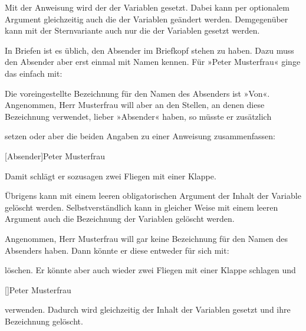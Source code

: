 \begin{Declaration}
\end{Declaration}
Mit der Anweisung  wird der  der Variablen
 gesetzt. Dabei kann per optionalem Argument gleichzeitig auch die
 der Variablen geändert werden. Demgegenüber kann mit der
Sternvariante  auch nur die  der
Variablen  gesetzt werden.
\begin{Example}
  In Briefen ist es üblich, den Absender im Briefkopf stehen zu haben. Dazu
  muss \KOMAScript{} den Absender aber erst einmal mit Namen kennen. Für
  »Peter Musterfrau« ginge das einfach mit:
\begin{lstcode}
\end{lstcode}
  Die voreingestellte Bezeichnung für den Namen des Absenders ist
  »Von«. Angenommen, Herr Musterfrau will aber an den Stellen, an denen
  \KOMAScript{} diese Bezeichnung verwendet, lieber »Absender« haben, so
  müsste er zusätzlich
\begin{lstcode}
\end{lstcode}
  setzen oder aber die beiden Angaben zu einer Anweisung zusammenfassen:
\begin{lstcode}
  [Absender]{Peter Musterfrau}
\end{lstcode}
  Damit schlägt er sozusagen zwei Fliegen mit einer Klappe.
\end{Example}
Übrigens kann mit einem leeren obligatorischen Argument 
der Inhalt der Variable gelöscht werden. Selbstverständlich kann in
gleicher Weise mit einem leeren Argument  auch die
Bezeichnung der Variablen gelöscht werden.
\begin{Example}
  Angenommen, Herr Musterfrau will gar keine Bezeichnung für den Namen des
  Absenders haben. Dann könnte er diese entweder für sich mit:
\begin{lstcode}
\end{lstcode}
  löschen. Er könnte aber auch wieder zwei Fliegen mit einer Klappe
  schlagen und
\begin{lstcode}
  []{Peter Musterfrau}
\end{lstcode}
  verwenden. Dadurch wird gleichzeitig der Inhalt der Variablen gesetzt und
  ihre Bezeichnung gelöscht.
\end{Example}
%
\EndIndexGroup


